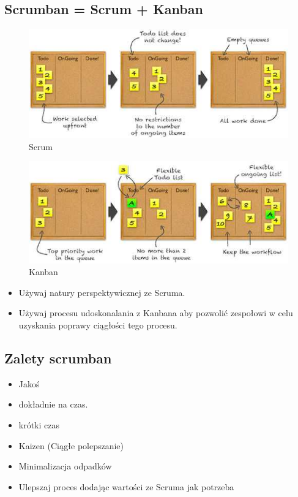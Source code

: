 \documentclass[epic,eepic,aspectratio=169,12pt]{article}
\begin{document}
\subsection{Scrumban = Scrum + Kanban}
\begin{figure}
\centering
\includegraphics[width=0.7\linewidth]{what-is-scrumban-1}
\caption{Scrum}
\label{fig:what-is-scrumban-1}
\end{figure}
\begin{figure}
\centering
\includegraphics[width=0.7\linewidth]{what-is-scrumban-2}
\caption{Kanban}
\label{fig:what-is-scrumban-2}
\end{figure}
\begin{itemize}
	\item Używaj natury perspektywicznej ze Scruma.
	\item Używaj procesu udoskonalania z Kanbana aby pozwolić zespołowi w celu uzyskania poprawy ciągłości tego procesu.
\end{itemize}

\subsection{Zalety scrumban}
\begin{itemize}
	\item Jakoś
	\item dokładnie na czas.
	\item krótki czas
	\item Kaizen (Ciągłe polepszanie)
	\item Minimalizacja odpadków
	\item Ulepszaj proces dodając wartości ze Scruma jak potrzeba
\end{itemize}
\end{document}
